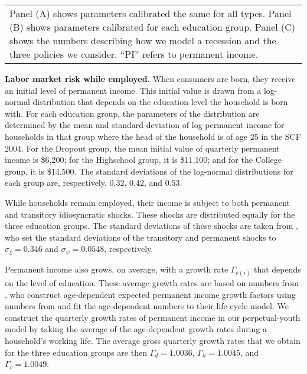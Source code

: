 \documentclass[\econtexRoot/HAFiscal]{subfiles}
\begin{document}
{\begin{table}[p]
\begin{tabular}{c}
      \end{tabular}
    \begin{tabular}{p{16cm}}
      \medskip
      \small Panel (A) shows parameters calibrated the same for all types. Panel (B) shows parameters calibrated for each education group. Panel (C) shows the numbers describing how we model a recession and the three policies we consider. ``PI'' refers to permanent income.
      \end{tabular}
    \notinsubfile{\label{tab:calibration}}
  \end{table}
  \clearpage
}

\textbf{Labor market risk while employed.} When consumers are born, they receive an initial level of permanent income. This initial value is drawn from a log-normal distribution that depends on the education level the household is born with. For each education group, the parameters of the distribution are determined by the mean and standard deviation of log-permanent income for households in that group where the head of the household is of age 25 in the SCF 2004. For the Dropout group, the mean initial value of quarterly permanent income is \$6,200; for the Highschool group, it is \$11,100; and for the College group, it is \$14,500. The standard deviations of the log-normal distributions for each group are, respectively, $0.32$, $0.42$, and $0.53$. 

While households remain employed, their income is subject to both permanent and transitory idiosyncratic shocks. These shocks are distributed equally for the three education groups. The standard deviations of these shocks are taken from \cite{carroll2020sticky}, who set the standard deviations of the transitory and permanent shocks to $\sigma_\xi=0.346$ and $\sigma_\psi=0.0548$, respectively. 

Permanent income also grows, on average, with a growth rate $\Gamma_{e(i)}$ that depends on the level of education. These average growth rates are based on numbers from \cite{carroll2020modeling}, who construct age-dependent expected permanent income growth factors using numbers from \cite{cagetti2003wealth} and fit the age-dependent numbers to their life-cycle model. We construct the quarterly growth rates of permanent income in our perpetual-youth model by taking the average of the age-dependent growth rates during a household's working life. The average gross quarterly growth rates that we obtain for the three education groups are then $\Gamma_d=1.0036$, $\Gamma_h=1.0045$, and $\Gamma_c=1.0049$.
\end{document}
